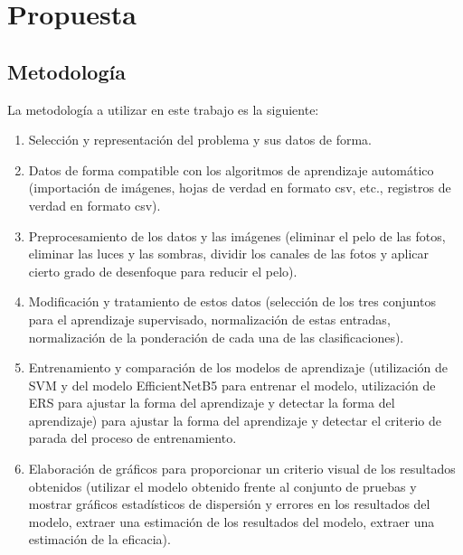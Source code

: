 \chapter{Propuesta}\label{chapter:proposal}

\section{Metodología}\label{sec:method}
La metodología a utilizar en este trabajo es la siguiente: 
\begin{enumerate}
    \item Selección y representación del problema y sus datos de forma.
    \item Datos de forma compatible con los algoritmos de aprendizaje automático (importación de imágenes, hojas de verdad en formato csv, etc., registros de verdad en formato csv).
    \item Preprocesamiento de los datos y las imágenes (eliminar el pelo de las fotos, eliminar las luces y las sombras, dividir los canales de las fotos y aplicar cierto grado de desenfoque para reducir el pelo).
    \item Modificación y tratamiento de estos datos (selección de los tres conjuntos para el aprendizaje supervisado, normalización de estas entradas, normalización de la ponderación de cada una de las clasificaciones).
    \item Entrenamiento y comparación de los modelos de aprendizaje (utilización de SVM y del modelo EfficientNetB5 para entrenar el modelo, utilización de ERS para ajustar la forma del aprendizaje y detectar la forma del aprendizaje) para ajustar la forma del aprendizaje y detectar el criterio de parada del proceso de entrenamiento. 
    \item Elaboración de gráficos para proporcionar un criterio visual de los resultados obtenidos (utilizar el modelo obtenido frente al conjunto de pruebas y mostrar gráficos estadísticos de dispersión y errores en los resultados del modelo, extraer una estimación de los resultados del modelo, extraer una estimación de la eficacia). 
\end{enumerate}